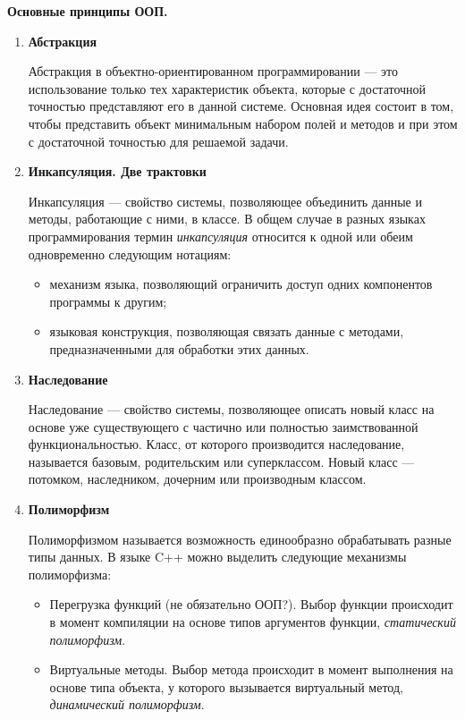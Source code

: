 \documentclass[12pt]{article}
\begin{document}
\textbf{Основные принципы ООП.}
\begin{enumerate}

	\item \textbf{Абстракция}
	
	Абстракция в объектно-ориентированном программировании --- это использование только тех характеристик объекта, которые с достаточной точностью представляют его в данной системе. Основная идея состоит в том, чтобы представить объект минимальным набором полей и методов и при этом с достаточной точностью для решаемой задачи.
	
	
	\item \textbf{Инкапсуляция. Две трактовки}
	
	
	Инкапсуляция --- свойство системы, позволяющее объединить данные и методы, работающие с ними, в классе. В общем случае в разных языках программирования термин \textit{инкапсуляция} относится к одной или обеим одновременно следующим нотациям:
	\begin{itemize}
	\item механизм языка, позволяющий ограничить доступ одних компонентов программы к другим;
	
	\item языковая конструкция, позволяющая связать данные с методами, предназначенными для обработки этих данных.
	
	\end{itemize}
	
	\item \textbf{Наследование}
	
	
	Наследование --- свойство системы, позволяющее описать новый класс на основе уже существующего с частично или полностью заимствованной функциональностью. Класс, от которого производится наследование, называется базовым, родительским или суперклассом. Новый класс --- потомком, наследником, дочерним или производным классом.
	
	\item \textbf{Полиморфизм}
	
	Полиморфизмом называется возможность единообразно обрабатывать разные типы данных. В языке C++ можно выделить следующие механизмы полиморфизма:
	
	\begin{itemize}
	\item Перегрузка функций (не обязательно ООП?). Выбор функции происходит в момент компиляции на основе типов аргументов функции, \textit{статический полиморфизм}.
	
	\item Виртуальные методы. Выбор метода происходит в момент выполнения на основе типа объекта, у которого вызывается виртуальный метод, \textit{динамический полиморфизм}.
	
	\end{itemize}
	
\end{enumerate}
\end{document}
